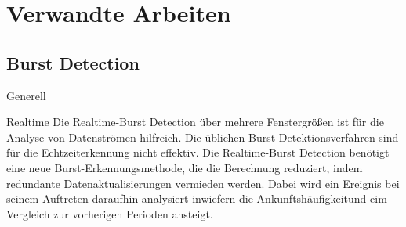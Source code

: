 \section{Verwandte Arbeiten}
\subsection{Burst Detection}
Generell


Realtime
Die Realtime-Burst Detection über mehrere Fenstergrößen ist für die Analyse von Datenströmen hilfreich. Die üblichen Burst-Detektionsverfahren sind für die Echtzeiterkennung nicht effektiv. Die Realtime-Burst Detection benötigt eine neue Burst-Erkennungsmethode, die die Berechnung reduziert, indem redundante Datenaktualisierungen vermieden werden. Dabei wird ein Ereignis bei seinem Auftreten daraufhin analysiert inwiefern die Ankunftshäufigkeitund eim Vergleich zur vorherigen Perioden ansteigt. 

\cite{10.1007978-3-642-36973-5_22}